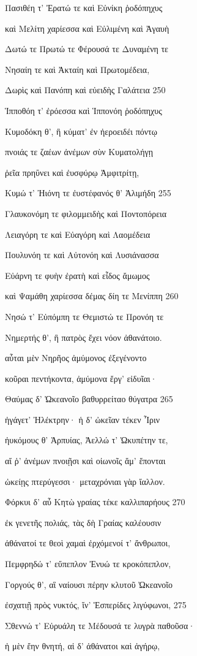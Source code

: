 Πασιθέη τ' Ἐρατώ τε καὶ Εὐνίκη ῥοδόπηχυς

καὶ Μελίτη χαρίεσσα καὶ Εὐλιμένη καὶ Ἀγαυὴ

Δωτώ τε Πρωτώ τε Φέρουσά τε Δυναμένη τε

Νησαίη τε καὶ Ἀκταίη καὶ Πρωτομέδεια,

Δωρὶς καὶ Πανόπη καὶ εὐειδὴς Γαλάτεια 250 

Ἱπποθόη τ' ἐρόεσσα καὶ Ἱππονόη ῥοδόπηχυς

Κυμοδόκη θ', ἣ κύματ' ἐν ἠεροειδέι πόντῳ

πνοιάς τε ζαέων ἀνέμων σὺν Κυματολήγῃ

ῥεῖα πρηΰνει καὶ ἐυσφύρῳ Ἀμφιτρίτῃ,

Κυμώ τ' Ἠιόνη τε ἐυστέφανός θ' Ἁλιμήδη 255

Γλαυκονόμη τε φιλομμειδὴς καὶ Ποντοπόρεια

Λειαγόρη τε καὶ Εὐαγόρη καὶ Λαομέδεια 

Πουλυνόη τε καὶ Αὐτονόη καὶ Λυσιάνασσα

Εὐάρνη τε φυὴν ἐρατὴ καὶ εἶδος ἄμωμος

καὶ Ψαμάθη χαρίεσσα δέμας δίη τε Μενίππη 260

Νησώ τ' Εὐπόμπη τε Θεμιστώ τε Προνόη τε

Νημερτής θ', ἣ πατρὸς ἔχει νόον ἀθανάτοιο.

αὗται μὲν Νηρῆος ἀμύμονος ἐξεγένοντο

κοῦραι πεντήκοντα, ἀμύμονα ἔργ' εἰδυῖαι· 

Θαύμας δ' Ὠκεανοῖο βαθυρρείταο θύγατρα 265

ἠγάγετ' Ἠλέκτρην· ἡ δ' ὠκεῖαν τέκεν Ἶριν 

ἠυκόμους θ' Ἁρπυίας, Ἀελλώ τ' Ὠκυπέτην τε, 

αἵ ῥ' ἀνέμων πνοιῇσι καὶ οἰωνοῖς ἅμ' ἕπονται

ὠκείῃς πτερύγεσσι· μεταχρόνιαι γὰρ ἴαλλον. 

Φόρκυι δ' αὖ Κητὼ γραίας τέκε καλλιπαρήους 270

ἐκ γενετῆς πολιάς, τὰς δὴ Γραίας καλέουσιν

ἀθάνατοί τε θεοὶ χαμαὶ ἐρχόμενοί τ' ἄνθρωποι,

Πεμφρηδώ τ' εὔπεπλον Ἐνυώ τε κροκόπεπλον,

Γοργούς θ', αἳ ναίουσι πέρην κλυτοῦ Ὠκεανοῖο

ἐσχατιῇ πρὸς νυκτός, ἵν' Ἑσπερίδες λιγύφωνοι, 275

Σθεννώ τ' Εὐρυάλη τε Μέδουσά τε λυγρὰ παθοῦσα· 

ἡ μὲν ἔην θνητή, αἱ δ' ἀθάνατοι καὶ ἀγήρῳ, 

